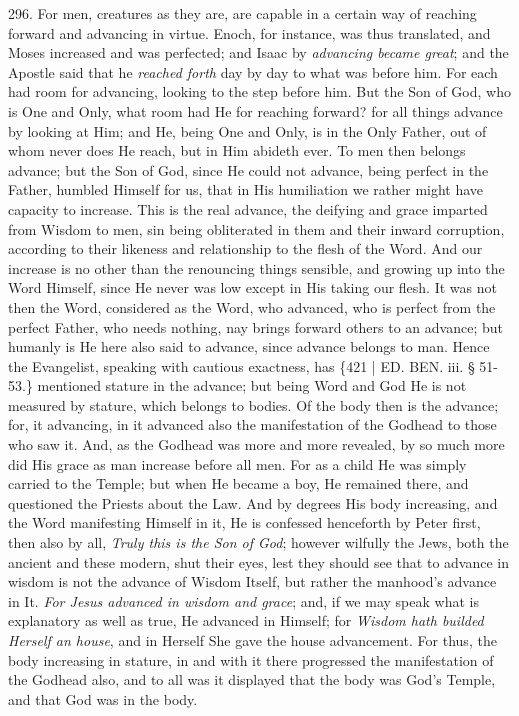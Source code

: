 296.
For men, creatures as they are, are capable in a certain way of
reaching forward and advancing in virtue. Enoch, for instance, was
thus translated, and Moses increased and was perfected; and Isaac by \emph{advancing
became great}; and the Apostle said that he \emph{reached forth}
day by day to what was before him. For each had room for advancing,
looking to the step before him. But the Son of God, who is One and
Only, what room had He for reaching forward? for all things advance by
looking at Him; and He, being One and Only, is in the Only Father, out
of whom never does He reach, but in Him abideth ever. To men then
belongs advance; but the Son of God, since He could not advance, being
perfect in the Father, humbled Himself for us, that in His humiliation
we rather might have capacity to increase. This is the real advance,
the deifying and grace imparted from Wisdom to men, sin being
obliterated in them and their inward corruption, according to their
likeness and relationship to the flesh of the Word. And our increase
is no other than the renouncing things sensible, and growing up into
the Word Himself, since He never was low except in His taking our
flesh. It was not then the Word, considered as the Word, who advanced,
who is perfect from the perfect Father, who needs nothing, nay brings
forward others to an advance; but humanly is He here also said to
advance, since advance belongs to man. Hence the Evangelist, speaking
with cautious exactness, has \{421 | ED. BEN. iii. § 51-53.\}
mentioned stature in the advance; but being Word and God He is not
measured by stature, which belongs to bodies. Of the body then is the
advance; for, it advancing, in it advanced also the manifestation of
the Godhead to those who saw it. And, as the Godhead was more and more
revealed, by so much more did His grace as man increase before all
men. For as a child He was simply carried to the Temple; but when He
became a boy, He remained there, and questioned the Priests about the
Law. And by degrees His body increasing, and the Word manifesting
Himself in it, He is confessed henceforth by Peter first, then also by
all, \emph{Truly this is the Son of God}; however wilfully the Jews,
both the ancient and these modern, shut their eyes, lest they should
see that to advance in wisdom is not the advance of Wisdom Itself, but
rather the manhood's advance in It. \emph{For Jesus advanced in wisdom
and grace}; and, if we may speak what is explanatory as well as
true, He advanced in Himself; for \emph{Wisdom hath builded Herself an
house}, and in Herself She gave the house advancement. For thus,
the body increasing in stature, in and with it there progressed the
manifestation of the Godhead also, and to all was it displayed that
the body was God's Temple, and that God was in the body.

